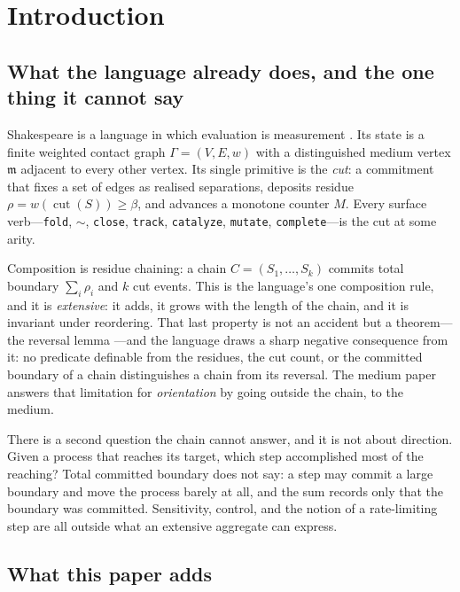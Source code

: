 \documentclass[11pt,twocolumn,a4paper]{article}
\theoremstyle{plain}
\theoremstyle{definition}
\theoremstyle{remark}
\newcommand{\Gph}{\Gamma}
\newcommand{\med}{\mathfrak{m}}
\newcommand{\cut}{\operatorname{cut}}
\newcommand{\res}{\rho}
\newcommand{\wt}{w}
\newcommand{\flo}{\beta}
\newcommand{\shk}[1]{\texttt{#1}}
\begin{document}
\tableofcontents

\section{Introduction}
\label{sec:intro}

\subsection{What the language already does, and the one thing it cannot say}

Shakespeare is a language in which evaluation is measurement
\citep{sachikonye2026shakespeare}. Its state is a finite weighted contact graph
$\Gph=(V,E,\wt)$ with a distinguished medium vertex $\med$ adjacent to every
other vertex. Its single primitive is the \emph{cut}: a commitment that fixes a
set of edges as realised separations, deposits residue
$\res=\wt(\cut(S))\ge\flo$, and advances a monotone counter $M$. Every surface
verb---\shk{fold}, \shk{$\sim$}, \shk{close}, \shk{track}, \shk{catalyze},
\shk{mutate}, \shk{complete}---is the cut at some arity.

Composition is residue chaining: a chain $C=(S_1,\dots,S_k)$ commits total
boundary $\sum_i\res_i$ and $k$ cut events. This is the language's one
composition rule, and it is \emph{extensive}: it adds, it grows with the length
of the chain, and it is invariant under reordering. That last property is not
an accident but a theorem---the reversal lemma
\citep{sachikonye2026medium}---and the language draws a sharp negative
consequence from it: no predicate definable from the residues, the cut count,
or the committed boundary of a chain distinguishes a chain from its reversal.
The medium paper answers that limitation for \emph{orientation} by going
outside the chain, to the medium.

There is a second question the chain cannot answer, and it is not about
direction. Given a process that reaches its target, which step accomplished
most of the reaching? Total committed boundary does not say: a step may commit
a large boundary and move the process barely at all, and the sum records only
that the boundary was committed. Sensitivity, control, and the notion of a
rate-limiting step are all outside what an extensive aggregate can express.

\subsection{What this paper adds}
\end{document}
